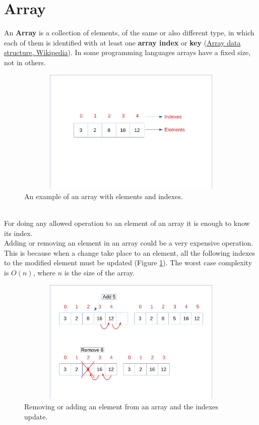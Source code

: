 \section{Array}
An \textbf{Array} is a collection of elements, of the same or also different type, in which each of them is identified with at least one \textbf{array index} or \textbf{key} \cite{wikiarray} (\href{https://en.wikipedia.org/wiki/Array_data_structure}{Array data structure, Wikipedia}). In some programming languages arrays have a fixed size, not in others.
\begin{figure}[hb]
	\includegraphics[width=14cm,height=6cm]{chapters/datastructures/images/array_1.pdf}
	\caption[]{An example of an array with elements and indexes.}
\end{figure}
\\
For doing any allowed operation to an element of an array it is enough to know its index. 
\\
Adding or removing an element in an array could be a very expensive operation. This is because when a change take place to an element, all the following indexes to the modified element must be updated (Figure \ref{array_2}). The worst case complexity is \(O(n)\), where \(n\) is the size of the array.
\begin{figure}[hb]
	\includegraphics[width=14cm,height=6cm]{chapters/datastructures/images/array_2.pdf}
	\caption[]{Removing or adding an element from an array and the indexes update. }
	\label{array_2}
\end{figure}

